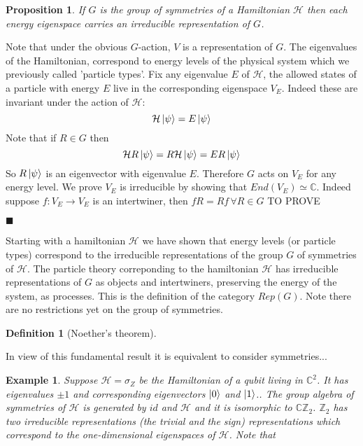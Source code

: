 \documentclass{article}
\newtheorem{definition}{Definition}
\newtheorem{example}{Example}
\newtheorem{proposition}[theorem]{Proposition}
\newenvironment{proof}[1][Proof]{\begin{trivlist}
		\item[\hskip \labelsep {\bfseries #1}]}{\begin{flushright}$\blacksquare$\end{flushright} \end{trivlist}}
\newcommand{\ham}{\mathcal{H}}
\begin{document}
\begin{proposition}
	If $G$ is the group of symmetries of a Hamiltonian $\mathcal{H}$ then each energy eigenspace carries an irreducible representation of $G$.
\end{proposition}
\begin{proof}
	Note that under the obvious $G$-action, $V$ is a representation of $G$. 
	The eigenvalues of the Hamiltonian, correspond to energy levels of the physical system which we previously called 'particle types'. Fix any eigenvalue $E$ of $\ham$, the allowed states of a particle with energy $E$ live in the corresponding eigenspace $V_E$. Indeed these are invariant under the action of $\ham$:
	$$ \ham \ket{\psi}= E\ket{\psi}$$
	Note that if $R\in G$ then
	$$ \ham R \ket{\psi}=R\ham \ket{\psi}=ER\ket{\psi}$$
	So $R\ket{\psi}$ is an eigenvector with eigenvalue $E$. Therefore $G$ acts on $V_E$ for any energy level.
	We prove $V_E$ is irreducible by showing that $End(V_E) \simeq \mathbb{C}$. Indeed suppose $f:V_E \rightarrow V_E$ is an intertwiner, then $fR=Rf \, \forall R \in G$
	TO PROVE
\end{proof}
Starting with a hamiltonian $\ham$ we have shown that energy levels (or particle types) correspond to the irreducible representations of the group $G$ of symmetries of $\ham$. The particle theory correponding to the hamiltonian $\ham$ has irreducible representations of $G$ as objects and intertwiners, preserving the energy of the system, as processes. This is the definition of the category $Rep(G)$. Note there are no restrictions yet on the group of symmetries.
\begin{definition}[Noether's theorem]
\end{definition}
In view of this fundamental result it is equivalent to consider symmetries...
\begin{example}
	Suppose $\ham = \sigma_Z$ be the Hamiltonian of a qubit living in $\mathbb{C}^2$. It has eigenvalues $\pm1$ and corresponding eigenvectors $\ket{0}$ and $\ket{1}$.. The group algebra of symmetries of $\ham$ is generated by $id$ and $\ham$ and it is isomorphic to $\mathbb{C}\mathbb{Z}_2$. $\mathbb{Z}_2$ has two irreducible representations (the trivial and the sign) representations which correspond to the one-dimensional eigenspaces of $\ham$. Note that 
\end{example}

\end{document}
